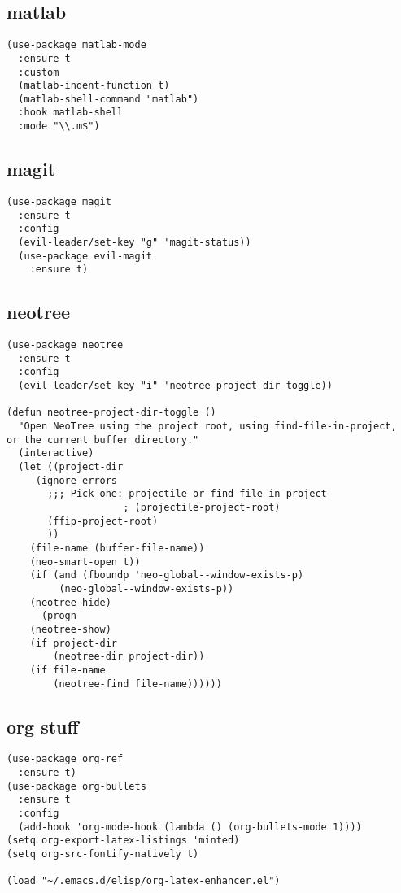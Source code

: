 \documentclass[11pt]{article}
\begin{document}
\subsection{matlab}
\label{sec-2-24}
\begin{verbatim}
(use-package matlab-mode
  :ensure t
  :custom
  (matlab-indent-function t)
  (matlab-shell-command "matlab")
  :hook matlab-shell
  :mode "\\.m$")
\end{verbatim}
\subsection{magit}
\label{sec-2-25}
\begin{verbatim}
(use-package magit
  :ensure t
  :config
  (evil-leader/set-key "g" 'magit-status))
  (use-package evil-magit
    :ensure t)
\end{verbatim}
\subsection{neotree}
\label{sec-2-26}
\begin{verbatim}
(use-package neotree
  :ensure t
  :config
  (evil-leader/set-key "i" 'neotree-project-dir-toggle))

(defun neotree-project-dir-toggle ()
  "Open NeoTree using the project root, using find-file-in-project,
or the current buffer directory."
  (interactive)
  (let ((project-dir
	 (ignore-errors
	   ;;; Pick one: projectile or find-file-in-project
					; (projectile-project-root)
	   (ffip-project-root)
	   ))
	(file-name (buffer-file-name))
	(neo-smart-open t))
    (if (and (fboundp 'neo-global--window-exists-p)
	     (neo-global--window-exists-p))
	(neotree-hide)
      (progn
	(neotree-show)
	(if project-dir
	    (neotree-dir project-dir))
	(if file-name
	    (neotree-find file-name))))))
\end{verbatim}
\subsection{org stuff}
\label{sec-2-27}
\begin{verbatim}
(use-package org-ref
  :ensure t)
(use-package org-bullets
  :ensure t
  :config
  (add-hook 'org-mode-hook (lambda () (org-bullets-mode 1))))
(setq org-export-latex-listings 'minted)
(setq org-src-fontify-natively t)

(load "~/.emacs.d/elisp/org-latex-enhancer.el")
\end{verbatim}
\end{document}

